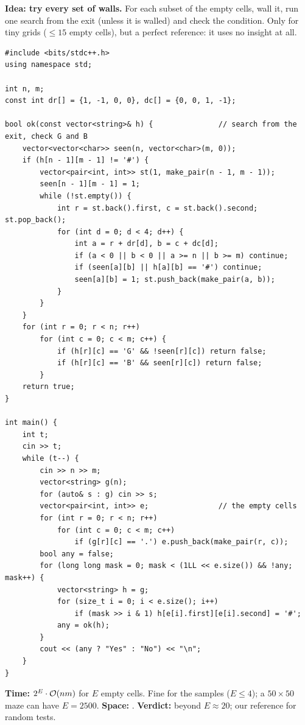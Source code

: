 \begin{bruteforcebox}
\textbf{Idea: try every set of walls.} For each subset of the empty cells, wall it, run one search from the exit (unless it is walled) and check the condition. Only for tiny grids ($\le 15$ empty cells), but a perfect reference: it uses no insight at all.

\begin{lstlisting}[style=cpp]
#include <bits/stdc++.h>
using namespace std;

int n, m;
const int dr[] = {1, -1, 0, 0}, dc[] = {0, 0, 1, -1};

bool ok(const vector<string>& h) {               // search from the exit, check G and B
    vector<vector<char>> seen(n, vector<char>(m, 0));
    if (h[n - 1][m - 1] != '#') {
        vector<pair<int, int>> st(1, make_pair(n - 1, m - 1));
        seen[n - 1][m - 1] = 1;
        while (!st.empty()) {
            int r = st.back().first, c = st.back().second; st.pop_back();
            for (int d = 0; d < 4; d++) {
                int a = r + dr[d], b = c + dc[d];
                if (a < 0 || b < 0 || a >= n || b >= m) continue;
                if (seen[a][b] || h[a][b] == '#') continue;
                seen[a][b] = 1; st.push_back(make_pair(a, b));
            }
        }
    }
    for (int r = 0; r < n; r++)
        for (int c = 0; c < m; c++) {
            if (h[r][c] == 'G' && !seen[r][c]) return false;
            if (h[r][c] == 'B' && seen[r][c]) return false;
        }
    return true;
}

int main() {
    int t;
    cin >> t;
    while (t--) {
        cin >> n >> m;
        vector<string> g(n);
        for (auto& s : g) cin >> s;
        vector<pair<int, int>> e;                // the empty cells
        for (int r = 0; r < n; r++)
            for (int c = 0; c < m; c++)
                if (g[r][c] == '.') e.push_back(make_pair(r, c));
        bool any = false;
        for (long long mask = 0; mask < (1LL << e.size()) && !any; mask++) {
            vector<string> h = g;
            for (size_t i = 0; i < e.size(); i++)
                if (mask >> i & 1) h[e[i].first][e[i].second] = '#';
            any = ok(h);
        }
        cout << (any ? "Yes" : "No") << "\n";
    }
}
\end{lstlisting}

\begin{complexitybox}
\textbf{Time:} $2^{E} \cdot \mathcal{O}(nm)$ for $E$ empty cells. Fine for the samples ($E \le 4$); a $50 \times 50$ maze can have $E = 2500$. \textbf{Space:} . \textbf{Verdict:} \tle{} beyond $E \approx 20$; our reference for random tests.
\end{complexitybox}
\end{bruteforcebox}

